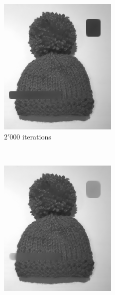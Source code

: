 \documentclass{paper}
\begin{document}
\begin{figure}[ht]
\vspace{3mm}
\begin{subfigure}[h]{0.3\textwidth}
	\centering
	\includegraphics[width=\textwidth]{hat-iter2000-lambda100-alpha0_001}
	\caption*{$2'000$ iterations}
\end{subfigure}
~
\begin{subfigure}[h]{0.3\textwidth}
	\centering
	\includegraphics[width=\textwidth]{hat-iter5000-lambda100-alpha0_001}

\end{subfigure}
\end{figure}
\end{document}

